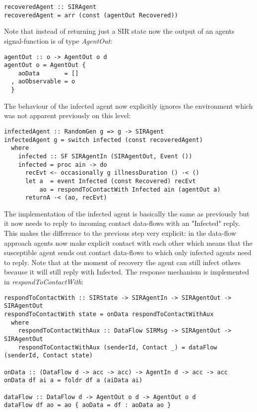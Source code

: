 \begin{verbatim}
recoveredAgent :: SIRAgent
recoveredAgent = arr (const (agentOut Recovered))
\end{verbatim}

Note that instead of returning just a SIR state now the output of an agents signal-function is of type \textit{AgentOut}:

\begin{verbatim}
agentOut :: o -> AgentOut o d
agentOut o = AgentOut {
    aoData       = []
  , aoObservable = o
  }
\end{verbatim}

The behaviour of the infected agent now explicitly ignores the environment which was not apparent previously on this level:

\begin{verbatim}
infectedAgent :: RandomGen g => g -> SIRAgent
infectedAgent g = switch infected (const recoveredAgent)
  where
    infected :: SF SIRAgentIn (SIRAgentOut, Event ())
    infected = proc ain -> do
      recEvt <- occasionally g illnessDuration () -< ()
      let a  = event Infected (const Recovered) recEvt
          ao = respondToContactWith Infected ain (agentOut a)
      returnA -< (ao, recEvt)
\end{verbatim}

The implementation of the infected agent is basically the same as previously but it now needs to reply to incoming contact data-flows with an "Infected" reply. This makes the difference to the previous step very explicit: in the data-flow approach agents now make explicit contact with each other which means that the susceptible agent sends out contact data-flows to which only infected agents need to reply. Note that at the moment of recovery the agent can still infect others because it will still reply with Infected. The response mechanism is implemented in \textit{respondToContactWith}:

\begin{verbatim}
respondToContactWith :: SIRState -> SIRAgentIn -> SIRAgentOut -> SIRAgentOut
respondToContactWith state = onData respondToContactWithAux
  where
    respondToContactWithAux :: DataFlow SIRMsg -> SIRAgentOut -> SIRAgentOut
    respondToContactWithAux (senderId, Contact _) = dataFlow (senderId, Contact state)
    
onData :: (DataFlow d -> acc -> acc) -> AgentIn d -> acc -> acc
onData df ai a = foldr df a (aiData ai)

dataFlow :: DataFlow d -> AgentOut o d -> AgentOut o d
dataFlow df ao = ao { aoData = df : aoData ao }
\end{verbatim}

